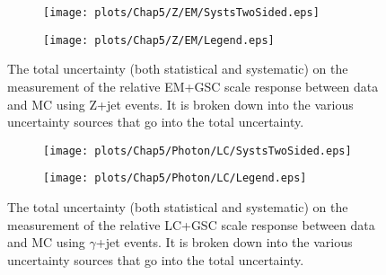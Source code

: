 \begin{figure}[!ht]
\captionsetup[subfigure]{labelformat=empty}
 \begin{center}
   \begin{subfigure}{0.55\textwidth}
     \hspace{-3cm}
     \texttt{[image: plots/Chap5/Z/EM/SystsTwoSided.eps]}
   \end{subfigure}
   \begin{subfigure}{0.55\textwidth}
     \hspace{-3cm}
     \texttt{[image: plots/Chap5/Z/EM/Legend.eps]}
   \end{subfigure}
 \end{center}
 \caption[Uncertainty on the EM+GSC scale response measurement using Z+jet]
 {\small The total uncertainty (both statistical and systematic) on the measurement of the relative EM+GSC scale response between data and MC using Z+jet events.  It is broken down into the various uncertainty sources that go into the total uncertainty.  }
 \label{Fig:ZJetSystsEM2016Main}
\end{figure}


\begin{figure}[!ht]
\captionsetup[subfigure]{labelformat=empty}
 \begin{center}
   \begin{subfigure}{0.55\textwidth}
     \hspace{-3cm}
     \texttt{[image: plots/Chap5/Photon/LC/SystsTwoSided.eps]}
   \end{subfigure}
   \begin{subfigure}{0.55\textwidth}
     \hspace{-3.cm}
     \texttt{[image: plots/Chap5/Photon/LC/Legend.eps]}
   \end{subfigure}
 \end{center}
 \caption[Uncertainty on the LC+GSC scale response measurement using $\gamma$+jet]
 {\small The total uncertainty (both statistical and systematic) on the measurement of the relative LC+GSC scale response between data and MC using $\gamma$+jet events.  It is broken down into the various uncertainty sources that go into the total uncertainty.  }
 \label{Fig:gJetSystsLC2016Main}
\end{figure}

